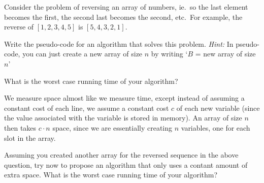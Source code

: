 \documentclass{article}
\begin{document}
\begin{Exercise}
    \ExeText
    Consider the problem of reversing an array of numbers, ie.\ so the last
    element becomes the first, the second last becomes the second, etc.\ For
    example, the reverse of $[1,2,3,4,5]$ is $[5,4,3,2,1]$.

    \Question
    Write the pseudo-code for an algorithm that solves this problem.
    \textit{Hint:} In pseudo-code, you can just create a new array of size $n$
    by writing `$B$ = new array of size $n$'

    \Question
    What is the worst case running time of your algorithm?

    \ExeText
    We measure space almost like we measure time, except instead of assuming a
    constant cost of each line, we assume a constant cost $c$ of each new
    variable (since the value associated with the variable is stored in memory).
    An array of size $n$ then takes $c \cdot n$ space, since we are essentially
    creating $n$ variables, one for each slot in the array.

    \Question
    Assuming you created another array for the reversed sequence in the above
    question, try now to propose an algorithm that only uses a contant amount of
    extra space. What is the worst case running time of your algorithm?
\end{Exercise}
\end{document}
